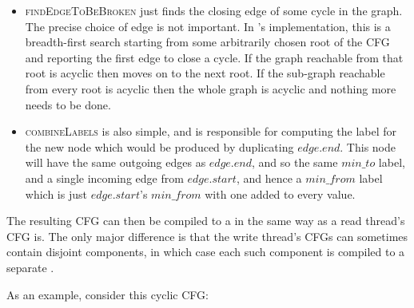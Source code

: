 \begin{itemize}
\item \textsc{findEdgeToBeBroken} just finds the closing edge of some
  cycle in the graph.  The precise choice of edge is not
  important.  In {\implementation}'s implementation, this is a
  breadth-first search starting from some arbitrarily chosen root of
  the CFG and reporting the first edge to close a cycle.  If the graph
  reachable from that root is acyclic then {\implementation} moves on
  to the next root.  If the sub-graph reachable from every root is
  acyclic then the whole graph is acyclic and nothing more needs to be
  done.
\item \textsc{combineLabels} is also simple, and is responsible for
  computing the label for the new node which would be produced by
  duplicating $\mathit{edge}.\mathit{end}$.  This node will have the
  same outgoing edges as $\mathit{edge}.\mathit{end}$, and so the same
  $min\_to$ label, and a single incoming edge from
  $\mathit{edge}.\mathit{start}$, and hence a $\mathit{min\_from}$
  label which is just $\mathit{edge}.\mathit{start}$'s
  $\mathit{min\_from}$ with one added to every value.
\end{itemize}

The resulting CFG can then be compiled to a {\StateMachine} in the
same way as a read thread's CFG is.  The only major difference is that
the write thread's CFGs can sometimes contain disjoint components, in
which case each such component is compiled to a separate
{\StateMachine}.

As an example, consider this cyclic CFG:


